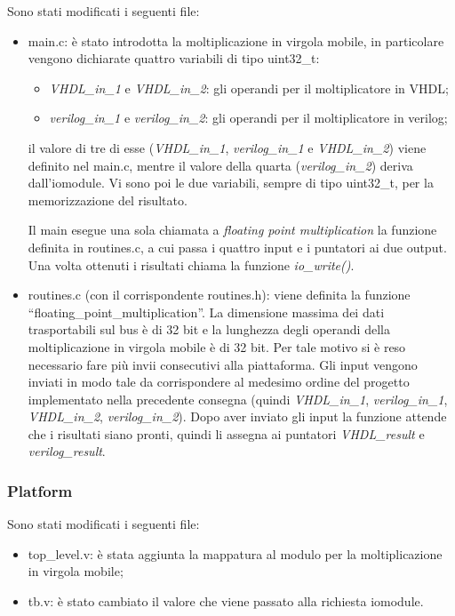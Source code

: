 \documentclass[]{IEEEtran}
\begin{document}
	Sono stati modificati i seguenti file:
	\begin{itemize}
		\item main.c: \`e stato introdotta la moltiplicazione in virgola mobile, in particolare vengono dichiarate quattro variabili di tipo uint32\_t:
		\begin{itemize}
			\item \textit{VHDL\_in\_1} e \textit{VHDL\_in\_2}: gli operandi per il moltiplicatore in VHDL;
			\item \textit{verilog\_in\_1} e \textit{verilog\_in\_2}: gli operandi per il moltiplicatore in verilog;
		\end{itemize}
		il valore di tre di esse (\textit{VHDL\_in\_1}, \textit{verilog\_in\_1} e \textit{VHDL\_in\_2}) viene definito nel main.c, mentre il valore della quarta (\textit{verilog\_in\_2}) deriva dall'iomodule. Vi sono poi le due variabili, sempre di tipo uint32\_t, per la memorizzazione del risultato.

		Il main esegue una sola chiamata a \textit{floating point multiplication} la funzione definita in routines.c, a cui passa i quattro input e i puntatori ai due output. Una volta ottenuti i risultati chiama la funzione \textit{io\_write()}.
		\item routines.c (con il corrispondente routines.h): viene definita la funzione ``floating\_point\_multiplication''. La dimensione massima dei dati trasportabili sul bus \`e di 32 bit e la lunghezza degli operandi della moltiplicazione in virgola mobile \`e di 32 bit. Per tale motivo si \`e reso necessario fare pi\`u invii consecutivi alla piattaforma. Gli input vengono inviati in modo tale da corrispondere al medesimo ordine del progetto implementato nella precedente consegna (quindi \textit{VHDL\_in\_1}, \textit{verilog\_in\_1}, \textit{VHDL\_in\_2}, \textit{verilog\_in\_2}). Dopo aver inviato gli input la funzione attende che i risultati siano pronti, quindi  li assegna ai puntatori \textit{VHDL\_result} e \textit{verilog\_result}.
	\end{itemize}

	\subsubsection{Platform}
	Sono stati modificati i seguenti file:
	\begin{itemize}
		\item top\_level.v: \`e stata aggiunta la mappatura al modulo per la moltiplicazione in virgola mobile;
		\item tb.v: \`e stato cambiato il valore che viene passato alla richiesta iomodule.
	\end{itemize}
\end{document}
